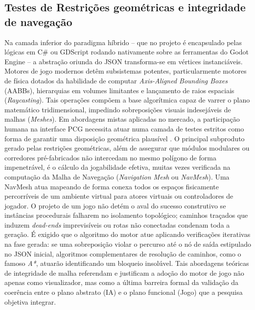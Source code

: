 \subsection{Testes de Restrições geométricas e integridade de navegação}
Na camada inferior do paradigma híbrido -- que no projeto é encapsulado pelas lógicas em C\# ou GDScript rodando nativamente sobre as ferramentas do Godot Engine -- a abstração oriunda do JSON transforma-se em vértices instanciáveis. Motores de jogo modernos detêm subsistemas potentes, particularmente motores de física dotados da habilidade de computar \textit{Axis-Aligned Bounding Boxes} (AABBs), hierarquias em volumes limitantes e lançamento de raios espaciais (\textit{Raycasting}). Tais operações compõem a base algorítmica capaz de varrer o plano matemático tridimensional, impedindo sobreposições visuais indesejáveis de malhas (\textit{Meshes}). Em abordagens mistas aplicadas no mercado, a participação humana na interface PCG necessita atuar numa camada de testes estritos como forma de garantir uma disposição geométrica plausível \cite{walton2020evaluating}.
O principal subproduto gerado pelas restrições geométricas, além de assegurar que módulos modulares ou corredores pré-fabricados não intercedam no mesmo polígono de forma impenetrável, é o cálculo da jogabilidade efetiva, muitas vezes verificada na computação da Malha de Navegação (\textit{Navigation Mesh} ou \textit{NavMesh}). Uma NavMesh atua mapeando de forma conexa todos os espaços fisicamente percorríveis de um ambiente virtual para atores virtuais ou controladores de jogador.
O projeto de um jogo não detém o aval do sucesso construtivo se instâncias procedurais falharem no isolamento topológico; caminhos traçados que induzem \textit{dead-ends} imprevisíveis ou rotas não conectadas condenam toda a geração. É exigido que o algoritmo do motor atue aplicando verificações iterativas na fase gerada: se uma sobreposição violar o percurso até o nó de saída estipulado no JSON inicial, algoritmos complementares de resolução de caminhos, como o famoso \textit{A*}, atuarão identificando um bloqueio insolúvel. Tais abordagens teóricas de integridade de malha referendam e justificam a adoção do motor de jogo não apenas como visualizador, mas como a última barreira formal da validação da coerência entre o plano abstrato (IA) e o plano funcional (Jogo) que a pesquisa objetiva integrar.